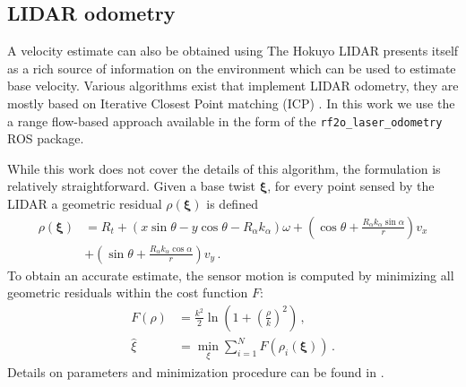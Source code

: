 \documentclass[times, utf8, diplomski, english]{fer}
\begin{document}
\subsection{LIDAR odometry}\label{subsection:lidar_odometry}
A velocity estimate can also be obtained using 
The Hokuyo LIDAR presents itself as a rich source of information on the environment which can be used to estimate base velocity.
Various algorithms exist that implement LIDAR odometry, they are mostly based on Iterative Closest Point matching (ICP) \citep{besl1992method}.
In this work we use the a range flow-based approach available in the form of the \verb|rf2o_laser_odometry| ROS package.

While this work does not cover the details of this algorithm, the formulation is relatively straightforward.
Given a base twist $\mathbf{\xi}$, for every point sensed by the LIDAR a geometric residual $\rho\left(\mathbf{\xi}\right)$ is defined 
\begin{equation}
\begin{split}
\rho\left(\mathbf{\xi}\right) &= R_t + \left(x\sin\theta - y\cos\theta - R_\alpha k_\alpha\right)\omega + \left(\cos\theta + \frac{R_\alpha k_\alpha \sin\alpha}{r}\right)v_x \\
 &+ \left(\sin\theta + \frac{R_\alpha k_\alpha \cos\alpha}{r}\right)v_y\, .
 \end{split}
\end{equation}
To obtain an accurate estimate, the sensor motion is computed by minimizing all geometric residuals within the cost function $F$:
\begin{align}
F\left(\rho\right) &= \frac{k^2}{2}\ln{\left(1 + \left(\frac{\rho}{k}\right)^2\right)}\, , \\
\hat{\xi} &= \min\limits_{\xi} \sum\limits_{i=1}^{N} F \left(\rho_i \left( \mathbf{\xi} \right) \right)\, .
\end{align}
Details on parameters and minimization procedure can be found in \citep{jaimez2016planar}.
\end{document}
